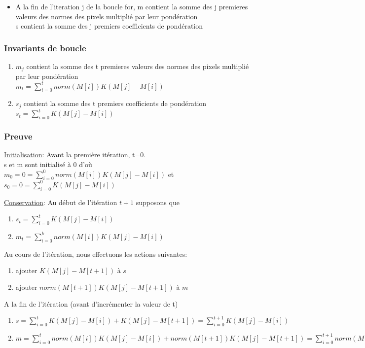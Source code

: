 \documentclass[12pt,a4paper]{article}
\begin{document}
\begin{itemize}
    \item A la fin de l'iteration j de la boucle for, m contient la somme des j premieres valeurs des normes des pixels multiplié par leur pondération\\
    s contient la somme des j premiers coefficients de pondération 
\end{itemize}

\subsubsection*{Invariants de boucle}
\begin{enumerate}
    \item $m_j$ contient la somme des t premieres valeurs des normes des pixels multiplié par leur pondération\\
    $m_t = \sum_{i=0}^t norm(M[i])K(M[j]-M[i])$
    \item  $s_j$ contient la somme des t premiers coefficients de pondération\\
    $s_t = \sum_{i=0}^t K(M[j]-M[i])$
\end{enumerate}
\subsubsection*{Preuve}
\underline{Initialisation}: Avant la première itération, t=0.\\
s et m sont initialisé à 0 d'où $m_0 = 0 = \sum_{i=0}^0 norm(M[i])K(M[j]-M[i])$ et $s_0 = 0 = \sum_{i=0}^0 K(M[j]-M[i])$ 

\underline{Conservation}: Au début de l'itération $t+1$ supposons que 
\begin{enumerate}
    \item $s_t = \sum_{i=0}^t K(M[j]-M[i])$
    \item $m_t = \sum_{i=0}^k norm(M[i])K(M[j]-M[i])$
\end{enumerate}
Au cours de l'itération, nous effectuons les actions suivantes:
\begin{enumerate}
    \item ajouter $K(M[j]-M[t+1])$ à $s$
    \item ajouter $norm(M[t+1])K(M[j]-M[t+1])$ à $m$ 
\end{enumerate}
A la fin de l'itération (avant d'incrémenter la valeur de t) 
\begin{enumerate}
    \item $s = \sum_{i=0}^t K(M[j]-M[i]) + K(M[j]-M[t+1]) = \sum_{i=0}^{t+1} K(M[j]-M[i]) $
    \item $m = \sum_{i=0}^t norm(M[i])K(M[j]-M[i]) + norm(M[t+1])K(M[j]-M[t+1]) = \sum_{i=0}^{t+1} norm(M[i])K(M[j]-M[i]) $
\end{enumerate} 
\end{document}
